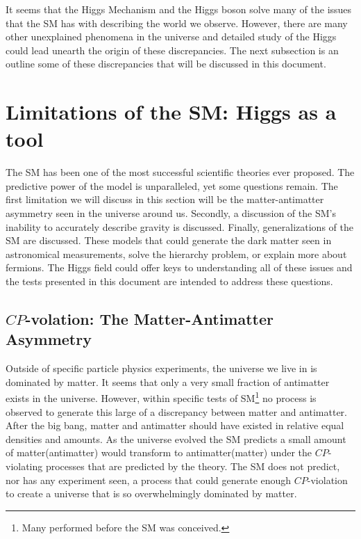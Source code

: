 It seems that the Higgs Mechanism and the Higgs boson solve many of the issues that the SM has with describing the world we observe. However, there are many other unexplained phenomena in the universe and detailed study of the Higgs could lead unearth the origin of these discrepancies. The next subsection is an outline some of these discrepancies that will be discussed in this document.

\section{Limitations of the SM: Higgs as a tool}
\label{sec:Limitations}

The SM has been one of the most successful scientific theories ever proposed. The predictive power of the model is unparalleled, yet some questions remain. The first limitation we will discuss in this section will be the matter-antimatter asymmetry seen in the universe around us. Secondly, a discussion of the SM's inability to accurately describe gravity is discussed. Finally, generalizations of the SM are discussed. These models that could generate the dark matter seen in astronomical measurements, solve the hierarchy problem, or explain more about fermions. The Higgs field could offer keys to understanding all of these issues and the tests presented in this document are intended to address these questions.

\subsection{$CP$-volation: The Matter-Antimatter Asymmetry}
\label{sec:CPviolation}

Outside of specific particle physics experiments, the universe we live in is dominated by matter. It seems that only a very small fraction of antimatter exists in the universe. However, within specific tests of SM\footnote{Many performed before the SM was conceived.} no process is observed to generate this large of a discrepancy between matter and antimatter. After the big bang, matter and antimatter should have existed in relative equal densities and amounts. As the universe evolved the SM predicts a small amount of matter(antimatter) would transform to antimatter(matter) under the $CP$-violating processes that are predicted by the theory. The SM does not predict, nor has any experiment seen, a process that could generate enough $CP$-violation to create a universe that is so overwhelmingly dominated by matter.

